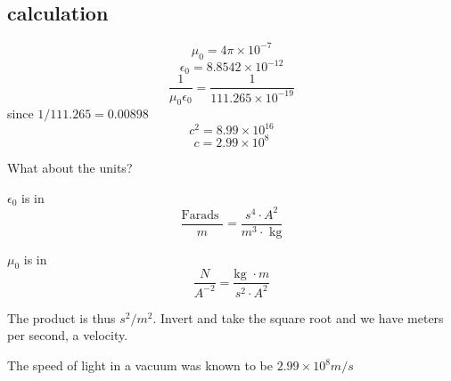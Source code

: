 \documentclass[11pt, oneside]{article}   	%
\begin{document}
\subsection*{calculation}

\[ \mu_0 = 4 \pi \times 10^{-7} \]
\[ \epsilon_0 = 8.8542 \times 10^{-12} \]
\[ \frac{1}{ \mu_0 \epsilon_0} = \frac{1}{111.265 \times 10^{-19}}  \]
since $1/111.265 = 0.00898$
\[ c^2 = 8.99 \times 10^{16} \]
\[ c = 2.99 \times 10^8 \]

What about the units?

$\epsilon_0$ is in 
\[ \frac{\text{Farads }}{m} =  \frac{s^4 \cdot A^2}{m^3 \cdot \text{ kg}} \]

$\mu_0$ is in
\[ \frac{N}{A^{-2}} =  \frac{\text {kg } \cdot m}{s^{2} \cdot A^{2}} \]

The product is thus $s^2 / m^{2}$.  Invert and take the square root and we have meters per second, a velocity.  

The speed of light in a vacuum was known to be $2.99 \times 10^8 m/s$
\end{document}
